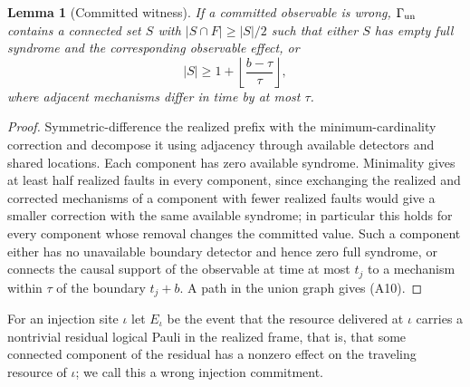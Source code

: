 \documentclass[aps,prx,reprint,superscriptaddress,nofootinbib,floatfix,longbibliography]{revtex4-2}
\newtheorem{lemma}[theorem]{Lemma}
\theoremstyle{definition}
\begin{document}
\begin{lemma}[Committed witness]\label{lem:A9}
If a committed observable is wrong, $\Gamma_{\rm un}$ contains a connected
set $S$ with $|S\cap F|\geq |S|/2$ such that either $S$ has empty full
syndrome and the corresponding observable effect, or
\begin{equation}
 |S|\geq 1+\left\lfloor\frac{b-\tau}{\tau}\right\rfloor,            \tag{A10}
\end{equation}
where adjacent mechanisms differ in time by at most $\tau$.
\end{lemma}
\begin{proof}
Symmetric-difference the realized prefix with the minimum-cardinality
correction and decompose it using adjacency through available detectors and
shared locations.  Each component has zero available syndrome.  Minimality
gives at least half realized faults in every component, since exchanging the
realized and corrected mechanisms of a component with fewer realized faults
would give a smaller correction with the same available syndrome; in
particular this holds for every component whose removal changes the
committed value.  Such a component either has no unavailable boundary
detector and hence zero full syndrome, or connects the causal support of the
observable at time at most $t_j$ to a mechanism within $\tau$ of the boundary
$t_j+b$.  A path in the union graph gives (A10).
\end{proof}

For an injection site $\iota$ let $E_\iota$ be the event that the resource
delivered at $\iota$ carries a nontrivial residual logical Pauli in the
realized frame, that is, that some connected component of the residual has
a nonzero effect on the traveling resource of $\iota$; we call this a wrong
injection commitment.
\end{document}
